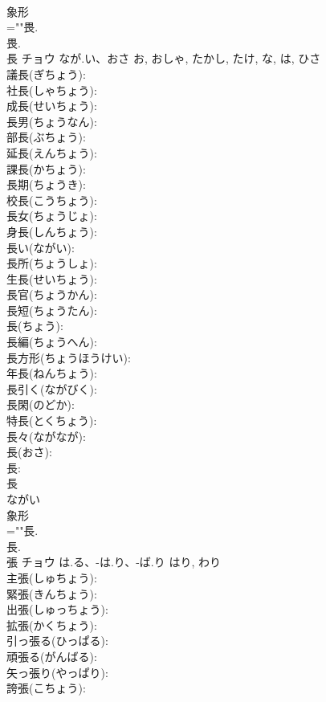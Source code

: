 \documentclass[8pt]{extreport}
\begin{document}
\begin{CJK}{UTF8}{min}
\\	象形 
\\	=""畏.
\\	畏.
\\	長	チョウ	なが.い、おさ	お, おしゃ, たかし, たけ, な, は, ひさ	
\\	議長(ぎちょう): 
\\	社長(しゃちょう): 
\\	成長(せいちょう): 
\\	長男(ちょうなん): 
\\	部長(ぶちょう): 
\\	延長(えんちょう): 
\\	課長(かちょう): 
\\	長期(ちょうき): 
\\	校長(こうちょう): 
\\	長女(ちょうじょ): 
\\	身長(しんちょう): 
\\	長い(ながい): 
\\	長所(ちょうしょ): 
\\	生長(せいちょう): 
\\	長官(ちょうかん): 
\\	長短(ちょうたん): 
\\	長(ちょう): 
\\	長編(ちょうへん): 
\\	長方形(ちょうほうけい): 
\\	年長(ねんちょう): 
\\	長引く(ながびく): 
\\	長閑(のどか): 
\\	特長(とくちょう): 
\\	長々(ながなが): 
\\	長(おさ): 
\\	長: 
\\	長	
\\	ながい	
\\	象形 
\\	=""長.
\\	長.
\\	張	チョウ	は.る、-は.り、-ば.り	はり, わり	
\\	主張(しゅちょう): 
\\	緊張(きんちょう): 
\\	出張(しゅっちょう): 
\\	拡張(かくちょう): 
\\	引っ張る(ひっぱる): 
\\	頑張る(がんばる): 
\\	矢っ張り(やっぱり): 
\\	誇張(こちょう): 

\end{CJK}
\end{document}
